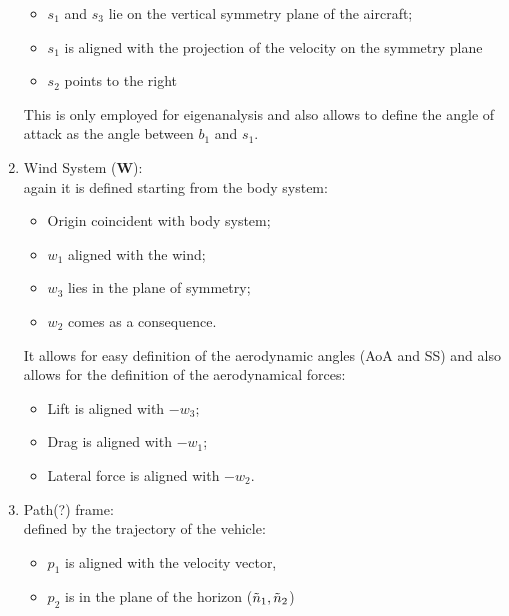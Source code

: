 \begin{enumerate}
\begin{itemize}
        \item $s_1$ and $s_3$ lie on the vertical symmetry plane of the aircraft;
        \item $s_1$ is aligned with the projection of the velocity on the symmetry plane
        \item $s_2$ points to the right
    \end{itemize}
    This is only employed for eigenanalysis and also allows to define the angle of attack as the angle between $b_1$ and $s_1$.
    \item Wind System (\textbf{W}):\\
    again it is defined starting from the body system:
    \begin{itemize}
        \item Origin coincident with body system;
        \item $w_1$ aligned with the wind;
        \item $w_3$ lies in the plane of symmetry;
        \item $w_2$ comes as a consequence.
    \end{itemize}
    It allows for easy definition of the aerodynamic angles (AoA and SS) 
    and also allows for the definition of the aerodynamical forces:
    \begin{itemize}
        \item Lift is aligned with $-w_3$;
        \item Drag is aligned with $-w_1$;
        \item Lateral force is aligned with $-w_2$.
    \end{itemize}

    \item Path(?) frame: \\
    defined by the trajectory of the vehicle:
    \begin{itemize}
        \item $p_1$ is aligned with the velocity vector,
        \item $p_2$ is in the plane of the horizon ($\Tilde{n}_1,\Tilde{n}_2$)
    \end{itemize}
\end{enumerate}

